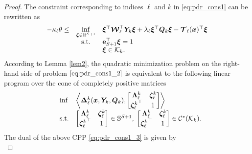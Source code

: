 \documentclass{article}
\newcommand{\st}{\textnormal{s.t.}}
\newcommand{\RR}{\mathbb{R}}
\begin{document}
\begin{proof}
The constraint corresponding to indices $\ell$ and $k$ in \eqref{eq:pdr_cons1} can be rewritten as %
\begin{equation}
\label{eq:pdr_cons1_2}
\begin{array}{ccl}
 - \kappa_\ell \theta \leq & \displaystyle \inf_{\bm \xi \in \RR^{S+1}} & \bm \xi^\top \bm{\mathcal{W}}^\top_\ell \bm Y_k \bm\xi + \lambda_\ell \bm \xi^\top \bm Q_k \bm \xi - \bm{\mathcal{T}}_\ell (\bm x)^\top \bm\xi \\
 &\st & \mathbf{e}_{S+1}^\top \bm \xi = 1\\
 & & \bm\xi \in  \mathcal K_k. \\
\end{array} 
\end{equation}
According to Lemma \ref{lem2}, the quadratic minimization problem on the right-hand side of problem $\eqref{eq:pdr_cons1_2}$ is equivalent to the following linear program over the cone of completely positive matrices
\begin{equation}
\label{eq:pdr_cons1_3}
\begin{array}{clll}
 & \displaystyle \inf & \left \langle \bm \Delta^k_\ell(\bm x,\bm Y_k,\bm Q_k), \begin{bmatrix}
\bm \Lambda^k_\ell & \bm \zeta^k_\ell\\ 
 {\bm \zeta^k_\ell}^\top & 1 
\end{bmatrix} \right \rangle \\
 &\st & 
\begin{bmatrix}
\bm \Lambda^k_\ell & \bm \zeta^k_\ell\\ 
 {\bm \zeta^k_\ell}^\top & 1 
\end{bmatrix} \in \mathbb{S}^{S+1}, \; \begin{bmatrix}
\bm \Lambda^k_\ell & \bm \zeta^k_\ell\\ 
 {\bm \zeta^k_\ell}^\top & 1 
\end{bmatrix} \in \mathcal{C^*} (\mathcal K_k).
\end{array}
\end{equation}
The dual  of the above CPP \eqref{eq:pdr_cons1_3} is given by
\begin{equation}

\end{equation}
\end{proof}
\end{document}
